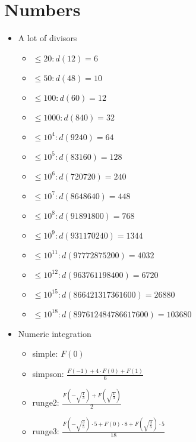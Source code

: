 \section{Numbers}

\begin{itemize}
	\item A lot of divisors
	\begin{itemize}
		\item $\leq 20: d(12)=6$
		\item $\leq 50: d(48)=10$
		\item $\leq 100: d(60)=12$
		\item $\leq 1000: d(840)=32$
		\item $\leq 10^4: d(9240)=64$
		\item $\leq 10^5: d(83160)=128$
		\item $\leq 10^6: d(720720)=240$
		\item $\leq 10^7: d(8648640)=448$
		\item $\leq 10^8: d(91891800)=768$
		\item $\leq 10^9: d(931170240)=1344$
		\item $\leq 10^{11}: d(97772875200)=4032$
		\item $\leq 10^{12}: d(963761198400)=6720$
		\item $\leq 10^{15}: d(866421317361600)=26880$
		\item $\leq 10^{18}: d(897612484786617600)=103680$
	\end{itemize}

	\item Numeric integration
	\begin{itemize}
		\item simple: $F(0)$
		\item simpson: $\frac{F(-1) + 4 \cdot F(0) + F(1)}{6}$
		\item runge2: $\frac{ F(-\sqrt{\frac{1}{3}}) + F(\sqrt{\frac{1}{3}}) }{2}$
		\item runge3: $\frac{ F(-\sqrt{\frac{3}{5}}) \cdot 5 + F(0) \cdot 8 +  F(\sqrt{\frac{3}{5}}) \cdot 5}{18}$
	\end{itemize}
\end{itemize}	
